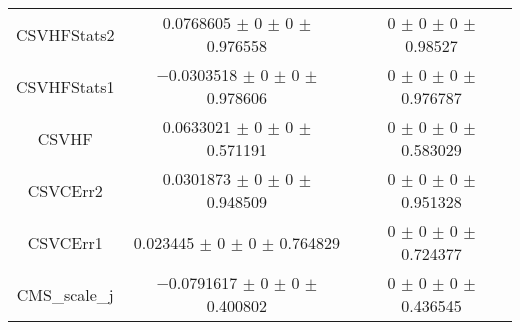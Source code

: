 \begin{table}
\begin{tabular}{ccc}
CSVHFStats2 	& \num{0.0768605} $\pm$ \num{0} $\pm$ \num{0} $\pm$ \num{0.976558} 	& \num{0} $\pm$ \num{0} $\pm$ \num{0} $\pm$ \num{0.98527}\\
CSVHFStats1 	& \num{-0.0303518} $\pm$ \num{0} $\pm$ \num{0} $\pm$ \num{0.978606} 	& \num{0} $\pm$ \num{0} $\pm$ \num{0} $\pm$ \num{0.976787}\\
CSVHF 	& \num{0.0633021} $\pm$ \num{0} $\pm$ \num{0} $\pm$ \num{0.571191} 	& \num{0} $\pm$ \num{0} $\pm$ \num{0} $\pm$ \num{0.583029}\\
CSVCErr2 	& \num{0.0301873} $\pm$ \num{0} $\pm$ \num{0} $\pm$ \num{0.948509} 	& \num{0} $\pm$ \num{0} $\pm$ \num{0} $\pm$ \num{0.951328}\\
CSVCErr1 	& \num{0.023445} $\pm$ \num{0} $\pm$ \num{0} $\pm$ \num{0.764829} 	& \num{0} $\pm$ \num{0} $\pm$ \num{0} $\pm$ \num{0.724377}\\
CMS\_scale\_j 	& \num{-0.0791617} $\pm$ \num{0} $\pm$ \num{0} $\pm$ \num{0.400802} 	& \num{0} $\pm$ \num{0} $\pm$ \num{0} $\pm$ \num{0.436545}\\
\bottomrule
\end{tabular}
\end{table}